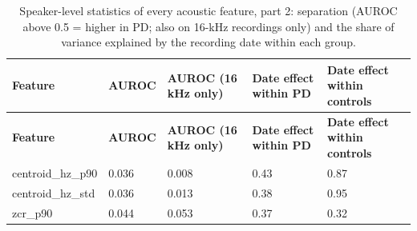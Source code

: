 \documentclass[11pt,a4paper]{article}
\begin{document}
\begin{center}\small\renewcommand{\arraystretch}{1.15}
\begin{longtable}{>{\raggedright\arraybackslash}p{4.20cm}>{\raggedleft\arraybackslash}p{2.55cm}>{\raggedleft\arraybackslash}p{2.55cm}>{\raggedleft\arraybackslash}p{2.55cm}>{\raggedleft\arraybackslash}p{2.55cm}}
\caption{Speaker-level statistics of every acoustic feature, part 2: separation (AUROC above 0.5 = higher in PD; also on 16-kHz recordings only) and the share of variance explained by the recording date within each group.}\\
\toprule
\textbf{\hspace{0pt}Feature} & \textbf{\hspace{0pt}AUROC} & \textbf{\hspace{0pt}AUROC (16 kHz only)} & \textbf{\hspace{0pt}Date effect within PD} & \textbf{\hspace{0pt}Date effect within controls}\\\midrule\endfirsthead
\toprule
\textbf{\hspace{0pt}Feature} & \textbf{\hspace{0pt}AUROC} & \textbf{\hspace{0pt}AUROC (16 kHz only)} & \textbf{\hspace{0pt}Date effect within PD} & \textbf{\hspace{0pt}Date effect within controls}\\\midrule\endhead
\bottomrule\endfoot
\hspace{0pt}centroid\_\allowbreak{}hz\_\allowbreak{}p90 & \hspace{0pt}0.036 & \hspace{0pt}0.008 & \hspace{0pt}0.43 & \hspace{0pt}0.87\\
\hspace{0pt}centroid\_\allowbreak{}hz\_\allowbreak{}std & \hspace{0pt}0.036 & \hspace{0pt}0.013 & \hspace{0pt}0.38 & \hspace{0pt}0.95\\
\hspace{0pt}zcr\_\allowbreak{}p90 & \hspace{0pt}0.044 & \hspace{0pt}0.053 & \hspace{0pt}0.37 & \hspace{0pt}0.32\\

\end{longtable}
\end{center}
\end{document}
